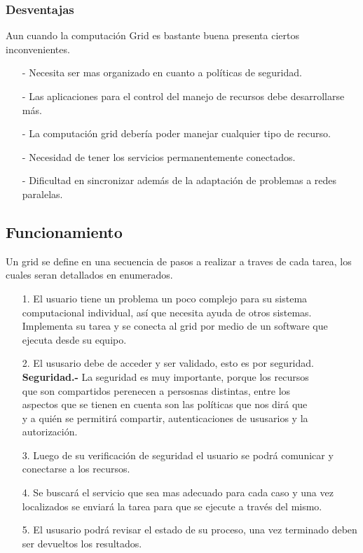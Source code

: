 \documentclass[12pt]{article}
\begin{document}
{{\subsubsection{Desventajas}
Aun cuando la computaci\'on Grid es bastante buena presenta ciertos inconvenientes.
\begin{itemize}
\item[-]Necesita ser mas organizado en cuanto a pol\'iticas de seguridad.
\item[-]Las aplicaciones para el control del manejo de recursos debe desarrollarse m\'as.
\item[-]La computaci\'on grid deber\'ia poder manejar cualquier tipo de recurso.
\item[-]Necesidad de tener los servicios permanentemente conectados.
\item[-]Dificultad en sincronizar adem\'as de la adaptaci\'on de problemas a redes paralelas.
\end{itemize}
}

\newpage
{\raggedright
\subsection{Funcionamiento}
Un grid se define en una secuencia de pasos a realizar a traves de cada tarea, los cuales seran detallados en enumerados.
\begin{itemize}
\item[1.]El usuario tiene un problema un poco complejo para su sistema computacional individual, as\'i que necesita ayuda de otros sistemas. Implementa su tarea y se conecta al grid por medio de un software que ejecuta desde su equipo.
\item[2.]El ususario debe de acceder y ser validado, esto es por seguridad.\vspace{0.1in}\\\hspace{0.2in}
\textbf{Seguridad.-} La seguridad es muy importante, porque los recursos \\\hspace{0.3in}que son compartidos perenecen a persosnas distintas, entre los \\\hspace{0.3in}aspectos que se tienen en cuenta son las pol\'iticas que nos dir\'a que \\\hspace{0.3in}y a qui\'en se permitir\'a compartir, autenticaciones de ususarios y la \\\hspace{0.3in}autorizaci\'on.
\item[3.]Luego de su verificaci\'on de seguridad el usuario se podr\'a comunicar y conectarse a los recursos.
\item[4.]Se buscar\'a el servicio que sea mas adecuado para cada caso y una vez localizados se enviar\'a la tarea para que se ejecute a trav\'es del mismo.
\item[5.]El ususario podr\'a revisar el estado de su proceso, una vez terminado deben ser devueltos los resultados.
\end{itemize}
}

}
\end{document}
